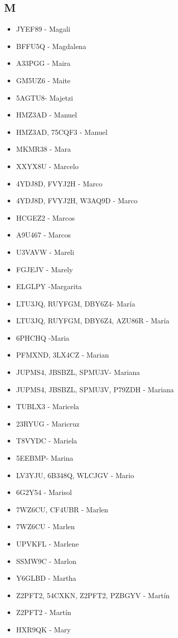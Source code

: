 \subsection*{M}
\begin{itemize}[leftmargin=*,nosep]
\item JYEF89 - Magali
\item BFFU5Q - Magdalena
\item A33PGG - Maira
\item GM5UZ6 - Maite
\item 5AGTU8- Majetzi
\item HMZ3AD - Manuel
\item HMZ3AD, 75CQF3 - Manuel
\item MKMR38 - Mara
\item XXYX8U - Marcelo
\item 4YDJ8D, FVYJ2H - Marco
\item 4YDJ8D, FVYJ2H, W3AQ9D - Marco
\item HCGEZ2 - Marcos
\item A9U467 - Marcos
\item U3VAVW - Mareli
\item FGJEJV - Marely
\item ELGLPY -Margarita
\item LTU3JQ,  RUYFGM, DBY6Z4- María
\item LTU3JQ, RUYFGM, DBY6Z4, AZU86R - María
\item 6PHCHQ -Maria
\item PFMXND, 3LX4CZ - Marian
\item JUPMS4, JBSBZL, SPMU3V- Mariana
\item JUPMS4, JBSBZL, SPMU3V, P79ZDH - Mariana
\item TUBLX3 - Maricela
\item 23RYUG - Maricruz
\item T8VYDC - Mariela
\item 5EEBMP- Marina
\item LV3YJU, 6B348Q, WLCJGV - Mario
\item 6G2Y54 - Marisol
\item 7WZ6CU, CF4UBR - Marlen
\item 7WZ6CU - Marlen
\item UPVKFL - Marlene
\item SSMW9C - Marlon
\item Y6GLBD - Martha
\item Z2PFT2, 54CXKN, Z2PFT2, PZBGYV - Martín
\item Z2PFT2  - Martín
\item HXR9QK - Mary

\end{itemize}
